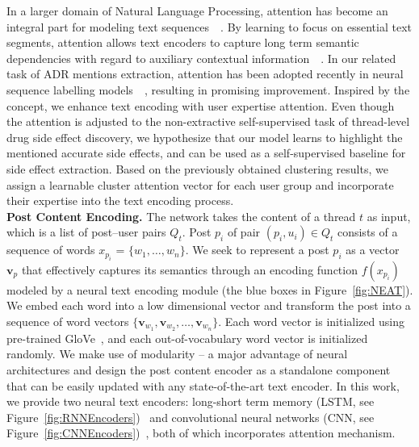 \documentclass{bmcart}
\begin{document}
In a larger domain of Natural Language Processing, attention has become an integral part for modeling text sequences~\cite{luong2015effective}~\cite{vaswani2017attention}. By learning to focus on essential text segments, attention allows text encoders to capture long term semantic dependencies with regard to auxiliary contextual information~\cite{chen2016neural}~\cite{feng2019attention}. 
In our related task of ADR mentions extraction, attention has been adopted recently in neural sequence labelling models~\cite{ding2018attentive}~\cite{ramamoorthy2018attentive}, 
resulting in promising improvement. 
Inspired by the concept, we enhance text encoding with user expertise attention. Even though the attention is adjusted to the non-extractive self-supervised task of thread-level drug side effect discovery, we hypothesize that our model learns to highlight the mentioned accurate side effects, and can be used as a self-supervised baseline for side effect extraction. Based on the previously obtained clustering results, we assign a learnable cluster attention vector for each user group and incorporate their expertise into the text encoding process. \\

\textbf{Post Content Encoding.} The network takes the content of a
thread $t$ as input, which is a list of post--user pairs $Q_t$.  Post
$p_i$ of pair $\left(p_i, u_i\right)\in Q_t$ consists of a sequence of words $x_{p_i}$ = $\{w_1, \ldots, w_n\}$.
We seek to represent a post $p_{i}$ as a vector $\boldsymbol{v}_{p}$ 
that effectively captures its semantics through an encoding function $f(x_{p_i})$ modeled by a neural text encoding module (the blue boxes in Figure~\ref{fig:NEAT}). 
We embed each word into a low dimensional vector 
and transform the post into a sequence of word vectors
$\{\boldsymbol{v}_{w_1}, \boldsymbol{v}_{w_2},\ldots,
\boldsymbol{v}_{w_n}\}$. Each word vector is initialized using pre-trained GloVe~\cite{pennington2014glove}, and each out-of-vocabulary word vector is initialized randomly. We make use of modularity -- a major advantage of neural architectures and design the post content encoder as a standalone component that can be easily updated with any state-of-the-art text encoder. In this work, we provide two neural text encoders: 
long-short term memory (LSTM, see Figure~\ref{fig:RNNEncoders})~\cite{hochreiter1997long} 
and convolutional neural networks 
(CNN, see Figure~\ref{fig:CNNEncoders})~\cite{kim2014convolutional}, 
both of which incorporates attention mechanism.
\end{document}
